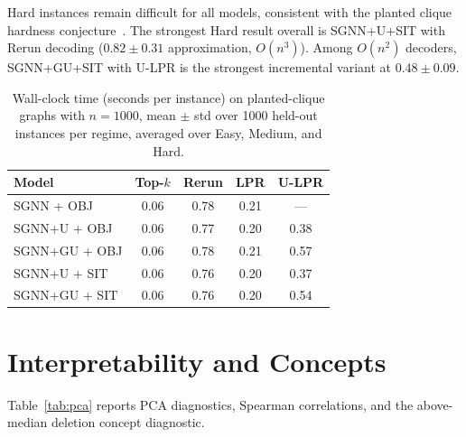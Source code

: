 \documentclass[journal,article,submit,pdftex,moreauthors]{Definitions/mdpi}
\begin{document}
Hard instances remain difficult for all models, consistent with the planted clique
hardness conjecture~\citep{manurangsi2021}. The strongest Hard result overall is
SGNN+U+SIT with Rerun decoding ($0.82{\pm}0.31$ approximation, $O(n^3)$). Among
$O(n^2)$ decoders, SGNN+GU+SIT with U-LPR is the strongest incremental variant
at $0.48{\pm}0.09$.

\begin{table}[H]
  \caption{Wall-clock time (seconds per instance) on planted-clique graphs with
    $n=1000$, mean $\pm$ std over 1000 held-out instances per regime, averaged over
  Easy, Medium, and Hard.}
  \label{tab:timing}
  \centering
  \begin{tabular}{lcccc}
    \toprule
    Model & Top-$k$ & Rerun & LPR & U-LPR \\
    \midrule
    SGNN + OBJ      & 0.06 & 0.78 & 0.21 & --- \\
    SGNN+U + OBJ    & 0.06 & 0.77 & 0.20 & 0.38 \\
    SGNN+GU + OBJ   & 0.06 & 0.78 & 0.21 & 0.57 \\
    SGNN+U + SIT    & 0.06 & 0.76 & 0.20 & 0.37 \\
    SGNN+GU + SIT   & 0.06 & 0.76 & 0.20 & 0.54 \\
    \bottomrule
  \end{tabular}
\end{table}

\section{Interpretability and Concepts}
\label{sec:concepts}

Table~\ref{tab:pca} reports PCA diagnostics, Spearman correlations, and the
above-median deletion concept diagnostic.
\end{document}
